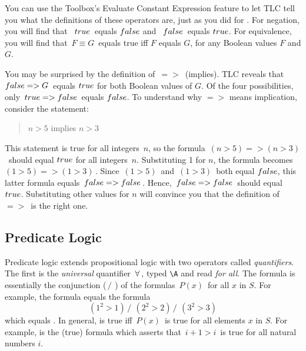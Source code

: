 \documentclass[fleqn,leqno]{article}
\begin{document}
You can use the Toolbox's \textsf{Evaluate Constant Expression}
feature to let TLC tell you what the definitions of these operators
are, just as you did for
.
For negation, you will find that \,$~\TRUE$\, equals $\FALSE$ and
\,$~\FALSE$\, equals $\TRUE$.  For equivalence, you will find that
\,$F\equiv G$\, equals true iff $F$ equals $G$,%
for any Boolean values $F$ and $G$.

You may be surprised by the definition of \,$=>$\, (implies).  TLC reveals
that \,$\FALSE => G$\, equals $\TRUE$ for both Boolean values of $G$.  Of
the four possibilities, only \,$\TRUE=>\FALSE$\, equals $\FALSE$.  To
understand why $=>$ means implication, consider the
statement:
\begin{quote}
$n>5$ implies $n>3$
\end{quote}
This statement is true for all integers~$n$, so the formula
\,$(n>5)=>(n>3)$\, should equal $\TRUE$ for all integers~$n$.
Substituting 1 for $n$, the formula becomes \,$(1>5)=>(1>3)$\,.  Since
\,$(1>5)$\, and \,$(1>3)$\, both equal $\FALSE$, this latter formula equals
\,$\FALSE=>\FALSE$\,.  Hence, \,$\FALSE=>\FALSE$\, should equal $\TRUE$.
Substituting other values for $n$ will convince you that the definition
of \,$=>$\, is the right one.


\medskip

\noindent{}



%
\subsection[Predicate Logic]{Predicate Logic%
}

Predicate logic extends propositional logic with two 
operators called
\emph{quantifiers}.  The first is the \emph{universal} quantifier
\,$\forall$\,, typed \verb|\A| and read \emph{for all}.  The formula
is essentially the conjunction 
  (\,$/\ $\,)
of the formulas \,$P(x)$\, for all $x$ in $S$.  For example, the formula
equals the formula
 \[ (1^{2} > 1) \,/\ \, (2^{2} > 2) \,/\ \, (3^{2} > 3) 
 \]
which equals \FALSE. In general, 
  is true iff
\,$P(x)$\, is true for all elements $x$ in $S$.  For example, 
is the (true) formula which asserts that \,$i+1>i$\, is true
for all natural numbers $i$.
\end{document}
